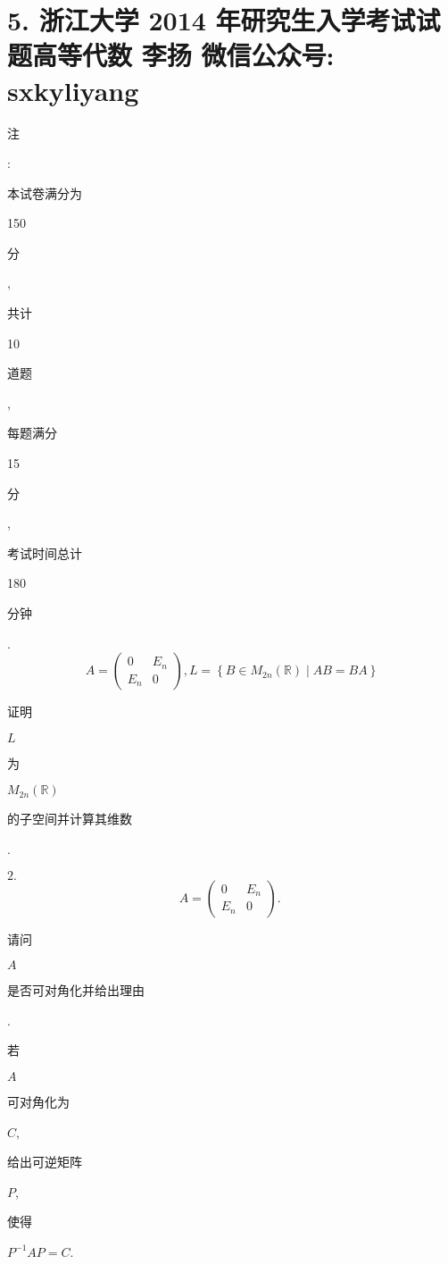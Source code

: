 \documentclass[10pt]{article}
\begin{document}
\section{5. 浙江大学 2014 年研究生入学考试试题高等代数 
 李扬 
 微信公众号: sxkyliyang}
\begin{CJK}{UTF8}{mj}注\end{CJK}: \begin{CJK}{UTF8}{mj}本试卷满分为\end{CJK} 150 \begin{CJK}{UTF8}{mj}分\end{CJK}, \begin{CJK}{UTF8}{mj}共计\end{CJK} 10 \begin{CJK}{UTF8}{mj}道题\end{CJK}, \begin{CJK}{UTF8}{mj}每题满分\end{CJK} 15 \begin{CJK}{UTF8}{mj}分\end{CJK}, \begin{CJK}{UTF8}{mj}考试时间总计\end{CJK} 180 \begin{CJK}{UTF8}{mj}分钟\end{CJK}.
$$
A=\left(\begin{array}{cc}
0 & E_{n} \\
E_{n} & 0
\end{array}\right), L=\left\{B \in M_{2 n}(\mathbb{R}) \mid A B=B A\right\}
$$
\begin{CJK}{UTF8}{mj}证明\end{CJK} $L$ \begin{CJK}{UTF8}{mj}为\end{CJK} $M_{2 n}(\mathbb{R})$ \begin{CJK}{UTF8}{mj}的子空间并计算其维数\end{CJK}.

$2 .$
$$
A=\left(\begin{array}{cc}
0 & E_{n} \\
E_{n} & 0
\end{array}\right) \text {. }
$$
\begin{CJK}{UTF8}{mj}请问\end{CJK} $A$ \begin{CJK}{UTF8}{mj}是否可对角化并给出理由\end{CJK}. \begin{CJK}{UTF8}{mj}若\end{CJK} $A$ \begin{CJK}{UTF8}{mj}可对角化为\end{CJK} $C$, \begin{CJK}{UTF8}{mj}给出可逆矩阵\end{CJK} $P$, \begin{CJK}{UTF8}{mj}使得\end{CJK} $P^{-1} A P=C$.
\end{document}
